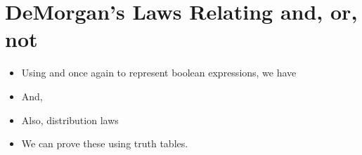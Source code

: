 \documentclass[letterpaper,10pt,english]{sphinxmanual}
\begin{document}
\section{DeMorgan’s Laws Relating and, or, not}
\label{\detokenize{lecture_notes/lec11_conditionals2:demorgans-laws-relating-and-or-not}}\begin{itemize}
\item {} 
Using  and  once again to represent boolean
expressions, we have

%
\begin{sphinxVerbatim}[commandchars=\\\{\}]
         
\end{sphinxVerbatim}

\item {} 
And,

%
\begin{sphinxVerbatim}[commandchars=\\\{\}]
         
\end{sphinxVerbatim}

\item {} 
Also, distribution laws

%
\begin{sphinxVerbatim}[commandchars=\\\{\}]
            
            
\end{sphinxVerbatim}

\item {} 
We can prove these using truth tables.

\end{itemize}
\end{document}
